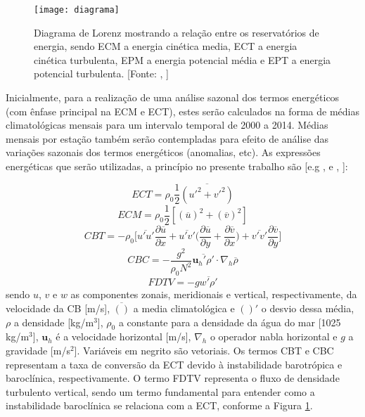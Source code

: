 \documentclass[portuguese,12pt,a4paper]{article}
\begin{document}
\begin{figure}[H]
	\centering
	\texttt{[image: diagrama]}
	\caption{Diagrama de Lorenz mostrando a relação entre os reservatórios de energia, sendo ECM a energia cinética media, ECT a energia cinética turbulenta, EPM a energia potencial média e EPT a energia potencial turbulenta. [Fonte: , \citeyear{magalhaes2017interaccao}] }
	\label{fig:diagrama}
\end{figure}

Inicialmente, para a realização de uma análise sazonal dos termos energéticos (com ênfase principal na ECM e ECT), estes serão calculados na forma de médias climatológicas mensais para um intervalo temporal de 2000 a 2014. Médias mensais por estação também serão contempladas para efeito de análise das variações sazonais dos termos energéticos (anomalias, etc). As expressões energéticas que serão utilizadas, a princípio no presente trabalho são [e.g , \citeyear{azevedo2008processos} e , \citeyear{Brum-2017}]:

\begin{equation}
ECT = \rho_0 \frac{1}{2} \overline{(u'^2 + v'^2)}
\end{equation}
\begin{equation}
	ECM = \rho_0 \frac{1}{2} [(\overline{u})^2 +  (\overline{v})^2]
\end{equation} 
\begin{equation}
CBT = - \rho_0 \Big[\overline{u'u'}\frac{\partial\overline{u}}{\partial x}  +  \overline{u'v'}\Big(\frac{\partial\overline{u}}{\partial y} +\frac{\partial\overline{v}}{\partial x} \Big) +  \overline{v'v'}\frac{\partial \overline{v}}{\partial y} \Big]
\end{equation}
\begin{equation}
	CBC = -\frac{g^2}{\rho_0 N^2}\overline{\boldsymbol{u}_h'\rho'}\cdot\nabla_h\overline{\rho}
\end{equation}
\begin{equation}
FDTV  = -g\overline{w'\rho'}
\end{equation}  sendo $u$, $v$ e $w$ as componentes zonais, meridionais e vertical, respectivamente, da velocidade da CB [m/s], $\overline{()}$ a media climatológica  e $()'$ o desvio dessa média, $\rho$ a densidade [kg/m$^3$], $\rho_0$ a constante para a densidade da água do mar [1025 kg/m$^3$], $\boldsymbol{u}_h$ é a velocidade horizontal [m/s], $\nabla_h$ o operador nabla horizontal e $g$ a gravidade [m/s$^2$]. Variáveis em negrito são vetoriais. Os termos CBT e CBC representam a taxa de conversão da ECT devido à instabilidade barotrópica e baroclínica, respectivamente. O termo FDTV representa o fluxo de densidade turbulento vertical, sendo um termo fundamental para entender como a instabilidade baroclínica se relaciona com a ECT, conforme a Figura \ref{fig:diagrama}.
\end{document}
